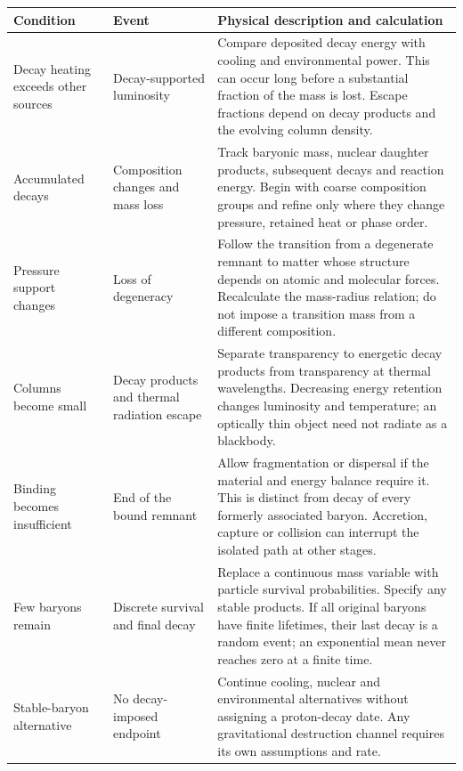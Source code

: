 {\small\renewcommand{\arraystretch}{1.17}
\begin{tabular}{@{}>{\raggedright\arraybackslash}p{}
 >{\raggedright\arraybackslash}p{}
 >{\raggedright\arraybackslash}p{}@{}}
\toprule
Condition & Event & Physical description and calculation \\\midrule
Decay heating exceeds other sources & Decay-supported luminosity &
Compare deposited decay energy with cooling and environmental power. This
can occur long before a substantial fraction of the mass is lost. Escape
fractions depend on decay products and the evolving column density. \\[4pt]
Accumulated decays & Composition changes and mass loss &
Track baryonic mass, nuclear daughter products, subsequent decays and reaction
energy. Begin with coarse composition groups and refine only where they
change pressure, retained heat or phase order. \\[4pt]
Pressure support changes & Loss of degeneracy &
Follow the transition from a degenerate remnant to matter whose structure
depends on atomic and molecular forces. Recalculate the mass-radius relation;
do not impose a transition mass from a different composition. \\[4pt]
Columns become small & Decay products and thermal radiation escape &
Separate transparency to energetic decay products from transparency at thermal
wavelengths. Decreasing energy retention changes luminosity and temperature;
an optically thin object need not radiate as a blackbody. \\[4pt]
Binding becomes insufficient & End of the bound remnant &
Allow fragmentation or dispersal if the material and energy balance require it.
This is distinct from decay of every formerly associated baryon. Accretion,
capture or collision can interrupt the isolated path at other stages. \\[4pt]
Few baryons remain & Discrete survival and final decay &
Replace a continuous mass variable with particle survival probabilities.
Specify any stable products. If all original baryons have finite lifetimes,
their last decay is a random event; an exponential mean never reaches zero
at a finite time. \\[4pt]
Stable-baryon alternative & No decay-imposed endpoint &
Continue cooling, nuclear and environmental alternatives without assigning a
proton-decay date. Any gravitational destruction channel requires its own
assumptions and rate. \\
\bottomrule
\end{tabular}}

